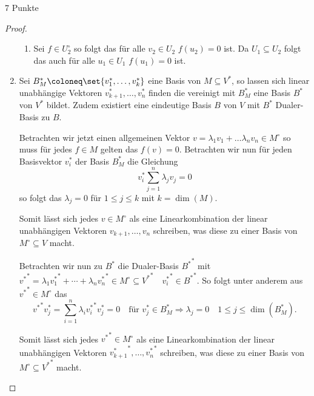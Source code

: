 \documentclass{problemset}
\begin{document}
\begin{problem}{7 Punkte}
\begin{proof}
\begin{enumerate}
\begin{enumerate}
                  \item Sei \(f \in U_2^\circ\) so folgt das für alle \(v_2 \in U_2\) \(f(u_2) = 0\) ist.
                        Da \(U_1 \subseteq U_2\) folgt das auch für alle \(u_1 \in U_1\) \(f(u_1) = 0\)
                        ist.
              \end{enumerate}

        \item \label{basis:annihilator} Sei \(B_M^* \coloneq \set{v_1^*, \ldots, v_k^*}\) eine Basis von \(M \subseteq
              V^*\), so lassen sich linear unabhängige Vektoren \(v_{k+1}^*, \ldots, v_n^*\)
              finden die vereinigt mit \(B_M^*\) eine Basis \(B^*\) von \(V^*\) bildet. Zudem
              existiert eine eindeutige Basis \(B\) von \(V\) mit \(B^*\) Dualer-Basis zu
              \(B\).

              Betrachten wir jetzt einen allgemeinen Vektor \(v = \lambda_1 v_1 + \ldots
              \lambda_n v_n \in M^\circ\) so muss für jedes \(f \in M\) gelten das \(f(v) =
              0\). Betrachten wir nun für jeden Basisvektor \(v_i^*\) der Basis \(B_M^*\) die
              Gleichung
              \begin{equation*}
                  v_i^* \sum_{j=1}^n\lambda_j v_j = 0
              \end{equation*}
              so folgt das \(\lambda_j = 0\) für \(1 \le j \le k\) mit \(k = \dim(M)\).

              Somit lässt sich jedes \(v \in M^\circ\) als eine Linearkombination der linear
              unabhängigen Vektoren \(v_{k+1}, \ldots, v_n\) schreiben, was diese zu einer
              Basis von \(M^\circ \subseteq V\) macht.

              Betrachten wir nun zu \(B^*\) die Dualer-Basis \({B^*}^*\) mit \({v^*}^* =
              \lambda_1 {v_1^*}^* + \cdots + \lambda_n {v_n^*}^* \in M^\circ \subseteq
              {V^*}^* \quad {v_i^*}^* \in {B^*}^*\). So folgt unter anderem aus \({v^*}^* \in
              M^\circ\) das
              \begin{equation*}
                  {v^*}^* v_j^* = \sum_{i=1}^{n} \lambda_i {v_i^*}^* v_j^* = 0 \quad \text{für } v_j^* \in B_M^* \Rightarrow \lambda_j = 0 \quad 1 \le j \le \dim(B_M^*).
              \end{equation*}

              Somit lässt sich jedes \({v^*}^* \in M^\circ\) als eine Linearkombination der
              linear unabhängigen Vektoren \({v_{k+1}^*}^*, \ldots, {v_n^*}^*\) schreiben,
              was diese zu einer Basis von \(M^\circ \subseteq {V^*}^*\) macht.


\end{enumerate}
\end{proof}
\end{problem}
\end{document}
